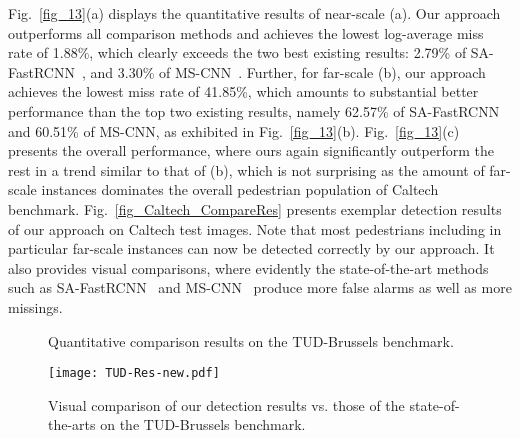 \documentclass[10pt,journal,compsoc,twoside]{IEEEtran}
\begin{document}
Fig.~\ref{fig_13}(a) displays the quantitative results of near-scale (a).
Our approach outperforms all comparison methods and achieves the lowest log-average miss rate of 1.88\%,
which clearly exceeds the two best existing results: 2.79\% of SA-FastRCNN~\cite{LiEtAl:cvpr15}, and 3.30\% of MS-CNN~\cite{CaiEtAl:eccv16}.
%
Further, for far-scale (b), our approach achieves the lowest miss rate of 41.85\%, which amounts to substantial better performance than the top two existing results,
namely 62.57\% of SA-FastRCNN and 60.51\% of MS-CNN, as exhibited in Fig.~\ref{fig_13}(b).
Fig.~\ref{fig_13}(c) presents the overall performance, where ours again significantly outperform the rest in a trend similar to that of (b),
which is not surprising as the amount of far-scale instances dominates the overall pedestrian population of Caltech benchmark.
%
Fig.~\ref{fig_Caltech_CompareRes} presents exemplar detection results of our approach on Caltech test images.
Note that most pedestrians including in particular far-scale instances can now be detected correctly by our approach.
It also provides visual comparisons,
where evidently the state-of-the-art methods such as SA-FastRCNN~\cite{LiEtAl:cvpr15} and MS-CNN~\cite{CaiEtAl:eccv16} produce more false alarms as well as more missings.


\begin{figure*}[!t]
\centering
{}
\caption{Quantitative comparison results on the TUD-Brussels benchmark.}
\label{fig_TUD}
\end{figure*}

\begin{figure}[!t]
\centering
\texttt{[image: TUD-Res-new.pdf]}\\
\caption{Visual comparison of our detection results vs. those of the state-of-the-arts on the TUD-Brussels benchmark.}
\label{fig_TUD_CompareRes}
\end{figure}
\end{document}
